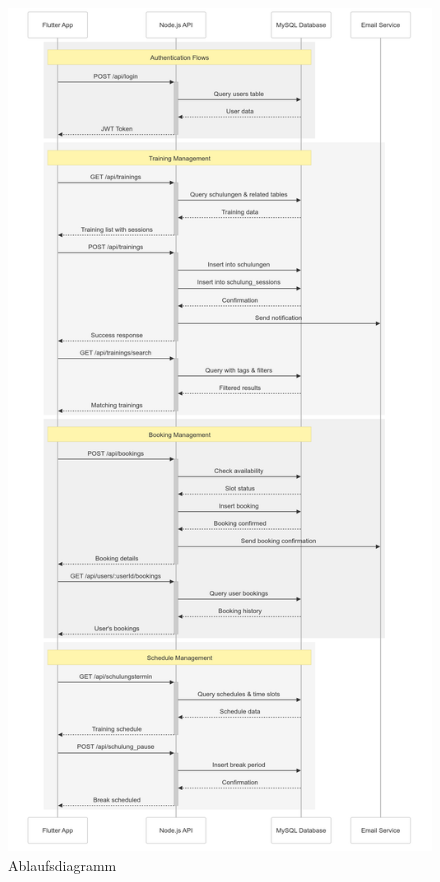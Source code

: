 \begin{figure}[p]
    \centering
    \includegraphics[width=\textwidth, height=\textheight, keepaspectratio]{img/Ablaufdiagram.png}%
    \caption{Ablaufsdiagramm}
    \label{Ablaufsdiagramm}
\end{figure}


